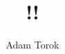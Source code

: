 \documentclass[12pt,a4paper, fullpage]{article}
\author{Adam Torok}
\begin{document}
\title{!!}
\maketitle
\end{document}
